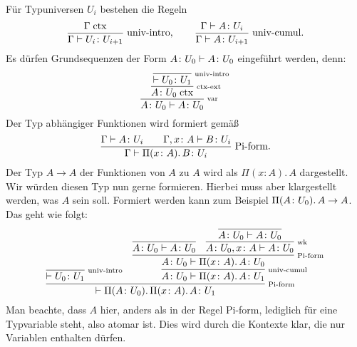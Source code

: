 Für Typuniversen $U_i$ bestehen die Regeln 
\[
\dfrac{\Gamma\;\mathrm{ctx}}{\Gamma\vdash U_i\colon U_{i+1}}\;\text{univ-intro},
\qquad\dfrac{\Gamma\vdash A\colon U_i}{\Gamma\vdash A\colon U_{i+1}}\;\text{univ-cumul}.
\]
Es dürfen Grundsequenzen der Form $A\colon U_0\vdash A\colon U_0$ eingeführt werden, denn:
\[
\infer[\infernote{var}]{A\colon\typeuniv_0\vdash A\colon\typeuniv_0}{
  \infer[\infernote{ctx-ext}]{A\colon\typeuniv_0\;\mathrm{ctx}}{
    \infer[\infernote{univ-intro}]{\vdash\typeuniv_0\colon\typeuniv_1}{}}}
\]
Der Typ abhängiger Funktionen wird formiert gemäß
\[\dfrac{\Gamma\vdash A\colon U_i\qquad\Gamma,x\colon A\vdash B\colon U_i}{
  \Gamma\vdash\Pi(x\colon A).\,B\colon U_i}\;\text{Pi-form}.\]
Der Typ $A\to A$ der Funktionen von $A$ zu $A$ wird als
$\Pi(x\colon A).\, A$ dargestellt. Wir würden diesen Typ nun gerne
formieren. Hierbei muss aber klargestellt werden, was $A$ sein soll.
Formiert werden kann zum Beispiel $\Pi(A\colon U_0).\,A\to A$.
Das geht wie folgt:
\[
\infer[\infernote{Pi-form}]{\vdash\Pi(A\colon\typeuniv_0).\, \Pi(x\colon A).\, A\colon\typeuniv_1}{
  \infer[\infernote{univ-intro}]{\vdash\typeuniv_0\colon\typeuniv_1}{}
  & \infer[\infernote{univ-cumul}]{A\colon\typeuniv_0\vdash\Pi(x\colon A).\, A\colon\typeuniv_1}{
      \infer[\infernote{Pi-form}]{A\colon\typeuniv_0\vdash\Pi(x\colon A).\, A\colon\typeuniv_0}{
        \infer{A\colon\typeuniv_0\vdash A\colon\typeuniv_0}{}
      & \infer[\infernote{wk}]{A\colon\typeuniv_0,x\colon A\vdash A\colon\typeuniv_0}{
          \infer{A\colon\typeuniv_0\vdash A\colon\typeuniv_0}{}}}}}
\]
Man beachte, dass $A$ hier, anders als in der Regel Pi-form, lediglich
für eine Typvariable steht, also atomar ist. Dies wird durch die
Kontexte klar, die nur Variablen enthalten dürfen.

